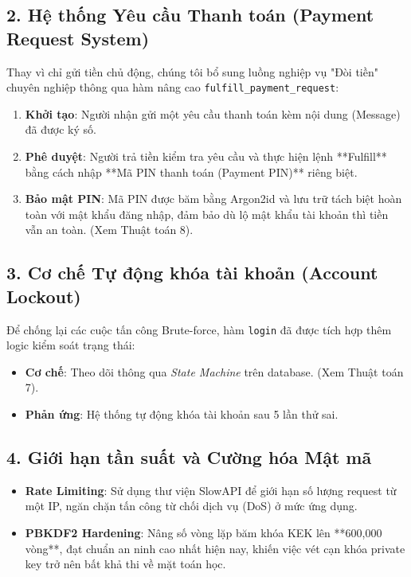 \documentclass[11pt,a4paper]{article}
\begin{document}
\subsection{2. Hệ thống Yêu cầu Thanh toán (Payment Request System)}
Thay vì chỉ gửi tiền chủ động, chúng tôi bổ sung luồng nghiệp vụ "Đòi tiền" chuyên nghiệp thông qua hàm nâng cao \texttt{fulfill\_payment\_request}:
\begin{enumerate}
    \item \textbf{Khởi tạo}: Người nhận gửi một yêu cầu thanh toán kèm nội dung (Message) đã được ký số.
    \item \textbf{Phê duyệt}: Người trả tiền kiểm tra yêu cầu và thực hiện lệnh **Fulfill** bằng cách nhập **Mã PIN thanh toán (Payment PIN)** riêng biệt.
    \item \textbf{Bảo mật PIN}: Mã PIN được băm bằng Argon2id và lưu trữ tách biệt hoàn toàn với mật khẩu đăng nhập, đảm bảo dù lộ mật khẩu tài khoản thì tiền vẫn an toàn. (Xem Thuật toán 8).
\end{enumerate}

\subsection{3. Cơ chế Tự động khóa tài khoản (Account Lockout)}
Để chống lại các cuộc tấn công Brute-force, hàm \texttt{login} đã được tích hợp thêm logic kiểm soát trạng thái:
\begin{itemize}
    \item \textbf{Cơ chế}: Theo dõi thông qua \textit{State Machine} trên database. (Xem Thuật toán 7).
    \item \textbf{Phản ứng}: Hệ thống tự động khóa tài khoản sau 5 lần thử sai.
\end{itemize}

\subsection{4. Giới hạn tần suất và Cường hóa Mật mã}
\begin{itemize}
    \item \textbf{Rate Limiting}: Sử dụng thư viện SlowAPI để giới hạn số lượng request từ một IP, ngăn chặn tấn công từ chối dịch vụ (DoS) ở mức ứng dụng.
    \item \textbf{PBKDF2 Hardening}: Nâng số vòng lặp băm khóa KEK lên **600,000 vòng**, đạt chuẩn an ninh cao nhất hiện nay, khiến việc vét cạn khóa private key trở nên bất khả thi về mặt toán học.
\end{itemize}
\end{document}
